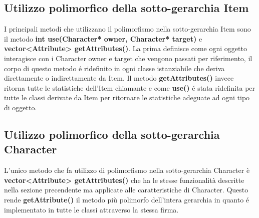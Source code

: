 \documentclass[../relazione.tex]{subfiles}
\begin{document}
\subsection{Utilizzo polimorfico della sotto-gerarchia Item}
\label{ssec:polimorfismo-item}
I principali metodi che utilizzano il polimorfismo nella sotto-gerarchia Item sono il metodo \textbf{int use(Character* owner, Character* target)} e 
\textbf{vector<Attribute> getAttributes()}. La prima definisce come ogni oggetto interagisce con i Character owner e target che vengono passati per riferimento,
il corpo di questo metodo é ridefinito in ogni classe istanziabile che deriva direttamente o indirettamente da Item.
Il metodo \textbf{getAttributes()} invece ritorna tutte le statistiche dell'Item chiamante e come \textbf{use()} é stata ridefinita per tutte le classi derivate da Item
per ritornare le statistiche adeguate ad ogni tipo di oggetto.
\subsection{Utilizzo polimorfico della sotto-gerarchia Character}
\label{ssec:polimorfismo-character}
L'unico metodo che fa utilizzo di polimorfismo nella sotto-gerarchia Character è \textbf{vector<Attribute> getAttributes()} che ha le stesse funzionalità descritte nella
sezione precendente ma applicate alle caratteristiche di Character. Questo rende \textbf{getAttribute()} il metodo più polimorfo dell'intera gerarchia in quanto
é implementato in tutte le classi attraverso la stessa firma. 
\end{document}
